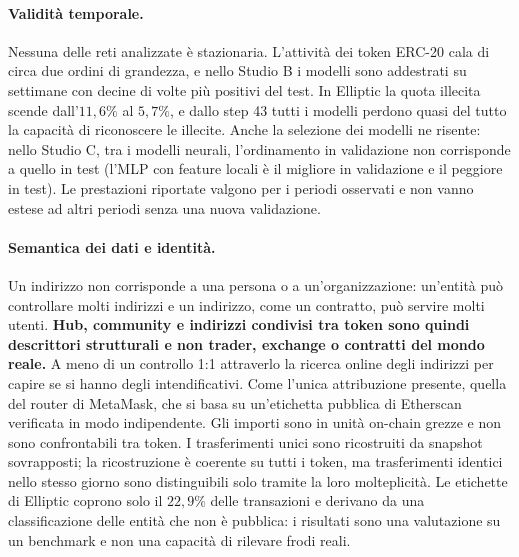 \documentclass[11pt]{article}
\begin{document}
\paragraph{Validità temporale.}
Nessuna delle reti analizzate è stazionaria. L'attività dei token ERC-20 cala
di circa due ordini di grandezza, e nello Studio B i modelli sono
addestrati su settimane con decine di volte più positivi del test. In
Elliptic la quota illecita scende dall'$11{,}6\%$ al $5{,}7\%$, e dallo
step 43 tutti i modelli perdono quasi del tutto la capacità di riconoscere le
illecite. Anche la selezione dei modelli ne risente: nello Studio C, tra i modelli
neurali, l'ordinamento in validazione non corrisponde a quello in test
(l'MLP con feature locali è il migliore in validazione e il peggiore in
test). Le prestazioni riportate valgono per i periodi
osservati e non vanno estese ad altri periodi senza una nuova validazione.

\paragraph{Semantica dei dati e identità.}
Un indirizzo non corrisponde a una persona o a un'organizzazione: un'entità
può controllare molti indirizzi e un indirizzo, come un contratto, può
servire molti utenti. \textbf{Hub, community e indirizzi condivisi tra token sono
quindi descrittori strutturali e non trader, exchange o contratti del mondo reale.}
A meno di un controllo 1:1 attraverlo la ricerca online degli indirizzi per capire se si hanno degli intendificativi. Come l'unica
attribuzione presente, quella del router di MetaMask, che si basa su un'etichetta
pubblica di Etherscan verificata in modo indipendente. Gli importi sono
in unità on-chain grezze e non sono confrontabili tra token. I trasferimenti
unici sono ricostruiti da snapshot sovrapposti; la ricostruzione è coerente
su tutti i token, ma trasferimenti identici nello stesso giorno sono
distinguibili solo tramite la loro molteplicità. Le etichette di Elliptic
coprono solo il $22{,}9\%$ delle transazioni e derivano da una
classificazione delle entità che non è pubblica: i risultati sono una
valutazione su un benchmark e non una capacità di rilevare frodi reali.
\end{document}
